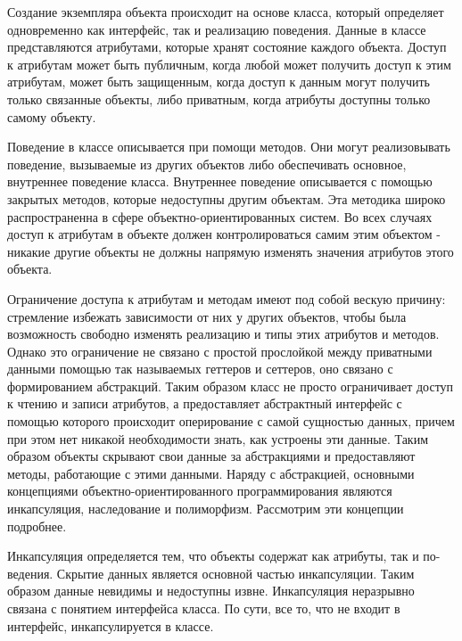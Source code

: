 \documentclass[russian,utf8,simple,hpadding=10mm,vpadding=20mm]{eskdtext}
\begin{document}
Создание экземпляра объекта происходит на основе класса, который определяет одновременно как интерфейс, так и реализацию поведения. Данные в классе представляются атрибутами, которые хранят состояние каждого объекта. Доступ к атрибутам может быть публичным, когда любой может получить доступ к этим атрибутам, может быть защищенным, когда доступ к данным могут получить только связанные объекты, либо приватным, когда атрибуты доступны только самому объекту.

Поведение в классе описывается при помощи методов. Они могут реализовывать поведение, вызываемые из других объектов либо обеспечивать основное, внутреннее поведение класса. Внутреннее поведение описывается с помощью закрытых методов, которые недоступны другим объектам.  Эта методика широко распространенна в сфере объектно-ориентированных систем. Во всех случаях доступ к атрибутам в объекте должен контролироваться самим этим объектом - никакие другие объекты не должны напрямую изменять значения атрибутов этого объекта.

Ограничение доступа к атрибутам и методам имеют под собой вескую причину: стремление избежать зависимости от них у других объектов, чтобы была возможность свободно изменять реализацию и типы этих атрибутов и методов.  Однако это ограничение не связано с простой прослойкой  между приватными данными  помощью так называемых геттеров и сеттеров, оно связано с формированием абстракций. Таким образом класс не просто ограничивает доступ к чтению и записи атрибутов,  а предоставляет  абстрактный интерфейс с помощью которого происходит оперирование с самой сущностью данных, причем при этом нет никакой необходимости знать, как устроены эти данные. Таким образом объекты скрывают свои данные за абстракциями и предоставляют методы, работающие с этими данными. Наряду с абстракцией, основными концепциями объектно-ориентированного программирования являются инкапсуляция, наследование и полиморфизм. Рассмотрим эти концепции подробнее.

Инкапсуляция определяется тем, что объекты содержат как атрибуты, так и по-
ведения. Скрытие данных является основной частью инкапсуляции. Таким образом
данные невидимы и недоступны извне.  Инкапсуляция неразрывно связана с понятием интерфейса класса. По сути, все то, что не входит в интерфейс, инкапсулируется в классе.
\end{document}
